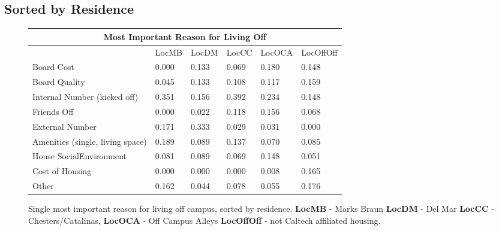 \documentclass[12pt]{article} %
\begin{document}
\subsection{Sorted by Residence}
\begin{figure}[H]
\begin{center}
\vspace{-10mm}
\begin{tabular}{|m{6 cm}|m{1.7 cm}|m{1.7 cm}|m{1.7 cm}|m{1.7 cm}|m{1.8 cm} |}
\hline
\multicolumn{6}{|c|}{Most Important Reason for Living Off}\\ \hline
& LocMB& LocDM& LocCC& LocOCA& LocOffOff\\ \hline
Board Cost   &  0.000 &  0.133 &  0.069 &  0.180 &  0.148\\ \hline
Board Quality   &  0.045 &  0.133 &  0.108 &  0.117 &  0.159\\ \hline
Internal Number \newline (kicked off)   &  0.351 &  0.156 &  0.392 &  0.234 &  0.148\\ \hline
Friends Off   &  0.000 &  0.022 &  0.118 &  0.156 &  0.068\\ \hline
External Number   &  0.171 &  0.333 &  0.029 &  0.031 &  0.000\\ \hline
Amenities \newline(single, living space)   &  0.189 &  0.089 &  0.137 &  0.070 &  0.085\\ \hline
House Social\newline Environment   &  0.081 &  0.089 &  0.069 &  0.148 &  0.051\\ \hline
Cost of Housing   &  0.000 &  0.000 &  0.000 &  0.008 &  0.165\\ \hline
Other   &  0.162 &  0.044 &  0.078 &  0.055 &  0.176\\ \hline
\end{tabular}
\end{center}
\vspace{-5mm}
	\caption{Single most important reason for living off campus, sorted by residence. 
	\newline\textbf{LocMB} - Marks Braun
	\newline\textbf{LocDM} - Del Mar
	\newline\textbf{LocCC} - Chesters/Catalinas,
	\newline\textbf{LocOCA} - Off Campus Alleys
	\newline\textbf{LocOffOff} - not Caltech affiliated housing.}
\end{figure}
\vspace{-20mm}
\end{document}
